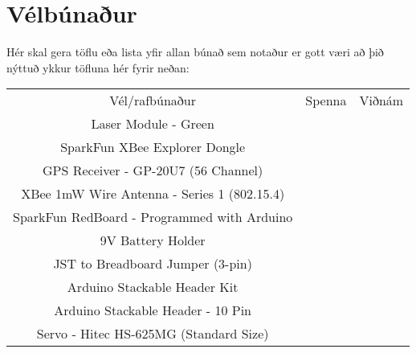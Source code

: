 \section{Vélbúnaður}
Hér skal gera töflu eða lista yfir allan búnað sem notaður er gott væri að þið nýttuð ykkur töfluna hér fyrir neðan:

\begin{center}
\begin{tabular}{ |c|c|c| } 
 \hline
 Vél/rafbúnaður &Spenna &Viðnám\\ 
 Laser Module - Green & &\\
 SparkFun XBee Explorer Dongle  & &\\ 
 GPS Receiver - GP-20U7 (56 Channel)  & &  \\ 
 XBee 1mW Wire Antenna - Series 1 (802.15.4) & & \\
 SparkFun RedBoard - Programmed with Arduino  & & \\
 9V Battery Holder & & \\
 JST to Breadboard Jumper (3-pin)  & & \\
 Arduino Stackable Header Kit & & \\
 Arduino Stackable Header - 10 Pin & & \\
 Servo - Hitec HS-625MG (Standard Size) & & \\
 \hline
\end{tabular}
\end{center}